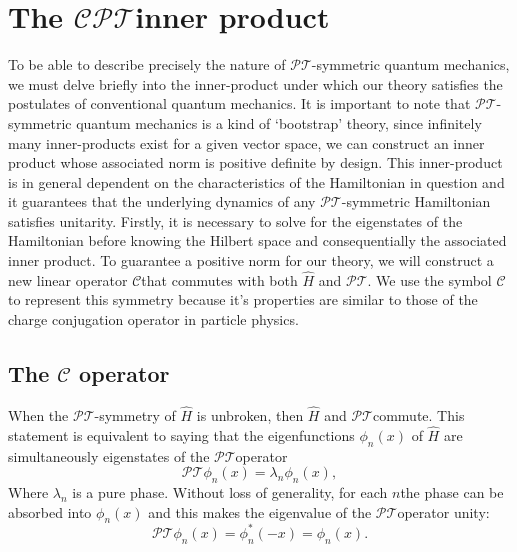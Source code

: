 \documentclass[12pt, a4paper]{report}
\newcommand\PT{\(\mathcal{PT}\)}
\newcommand\CC{\(\mathcal{C}\)}
\begin{document}
\section{The \texorpdfstring{$\mathcal{CPT}$}\:\:inner product}\label{CPT}
To be able to describe precisely the nature of \PT-symmetric quantum mechanics, we must delve briefly into the inner-product under which our theory satisfies the postulates of conventional quantum mechanics. It is important to note that \PT-symmetric quantum mechanics is a kind of `bootstrap' theory\cite{MakingSense}, since infinitely many inner-products exist for a given vector space, we can construct an inner product whose associated norm is positive definite by design. This inner-product is in general dependent on the characteristics of the Hamiltonian in question and it guarantees that the underlying dynamics of any \PT-symmetric Hamiltonian satisfies unitarity\cite{MustaHbeHermitian}.
Firstly, it is necessary to solve for the eigenstates of the Hamiltonian before knowing the Hilbert space and consequentially the associated inner product.
To guarantee a positive norm for our theory, we will construct a new linear operator \CC\:that commutes with both $\hat{H}$ and \PT. We use the symbol \CC\: to represent this symmetry because it's properties are similar to those of the charge conjugation operator in particle physics\cite{MakingSense}.

\subsection{The $\mathcal{C}$ operator}\label{CC}
When the \PT-symmetry of $\hat{H}$ is unbroken, then $\hat{H}$ and \PT\:commute. This statement is equivalent to saying that the eigenfunctions $\phi_n(x)$ of $\hat{H}$ are simultaneously eigenstates of the \PT\:operator\cite{Bender_2004}
\begin{equation}\label{eq:2.4}
\mathcal{PT}\phi_n(x) = \lambda_n \phi_n(x),
\end{equation}
Where $\lambda_n$ is a pure phase. Without loss of generality, for each $n$\:the phase can be absorbed into $\phi_n(x)$ and this makes the eigenvalue of the \PT operator unity\cite{Bender_2004}: 
\begin{equation}\label{eq:2.5}
\mathcal{PT}\phi_n(x) = \phi_{n}^{*}(-x) = \phi_n(x).
\end{equation}
\end{document}
